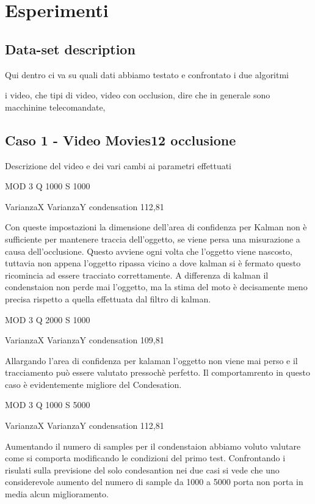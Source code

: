 
\section{Esperimenti}

\subsection{Data-set description}
Qui dentro ci va su quali dati abbiamo testato e confrontato i due algoritmi

i video, che tipi di video, video con occlusion, dire che in generale sono macchinine telecomandate, 

\subsection{Caso 1 - Video Movies12 occlusione}
Descrizione del video e dei vari cambi ai parametri effettuati 

MOD 3 Q 1000 S 1000

VarianzaX VarianzaY condensation
112,81

Con queste impostazioni la dimensione dell'area di confidenza per Kalman non è sufficiente per mantenere traccia dell'oggetto, se viene persa una misurazione a causa dell'occlusione. Questo avviene ogni volta che l'oggetto viene nascosto, tuttavia non appena l'oggetto ripassa vicino a dove kalman si è fermato questo ricomincia ad essere tracciato correttamente. A differenza di kalman il condenstaion non perde mai l'oggetto, ma la stima del moto è decisamente meno precisa rispetto a quella effettuata dal filtro di kalman.

MOD 3 Q 2000 S 1000

VarianzaX VarianzaY condensation
109,81

Allargando l'area di confidenza per kalaman l'oggetto non viene mai perso e il tracciamento può essere valutato pressochè perfetto. Il comportamrento in questo caso è evidentemente migliore del Condesation.



MOD 3 Q 1000 S 5000

VarianzaX VarianzaY condensation
112,81

Aumentando il numero di samples per il condenstaion abbiamo voluto valutare come  si comporta modificando le condizioni del primo test. Confrontando i risulati sulla previsione del solo condesantion nei due casi si vede che uno considerevole aumento del numero di sample da 1000 a 5000 porta non porta in media alcun miglioramento.


